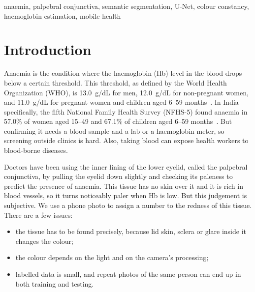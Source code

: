 \documentclass[conference]{IEEEtran}
\begin{document}
\begin{IEEEkeywords}
anaemia, palpebral conjunctiva, semantic segmentation, U-Net, colour
constancy, haemoglobin estimation, mobile health
\end{IEEEkeywords}

\section{Introduction}
Anaemia is the condition where the haemoglobin (Hb) level in the blood drops
below a certain threshold. This threshold, as defined by the World Health
Organization (WHO), is 13.0~g/dL for men, 12.0~g/dL for non-pregnant women, and
11.0~g/dL for pregnant women and children aged 6--59 months~\cite{who2011}. In
India specifically, the fifth National Family Health Survey (NFHS-5) found
anaemia in 57.0\% of women aged 15--49 and 67.1\% of children aged 6--59
months~\cite{nfhs5}. But confirming it needs a blood sample and a lab or a
haemoglobin meter, so screening outside clinics is hard. Also, taking blood can
expose health workers to blood-borne diseases.

Doctors have been using the inner lining of the lower eyelid, called the
palpebral conjunctiva, by pulling the eyelid down slightly and checking its
paleness to predict the presence of anaemia. This tissue has no skin over it
and it is rich in blood vessels, so it turns noticeably paler when Hb is low.
But this judgement is subjective. We use a phone photo to assign a number to
the redness of this tissue. There are a few issues:
\begin{itemize}
  \item the tissue has to be found precisely, because lid skin, sclera or glare
    inside it changes the colour;
  \item the colour depends on the light and on the camera's processing;
  \item labelled data is small, and repeat photos of the same person can end up
    in both training and testing.
\end{itemize}
\end{document}
